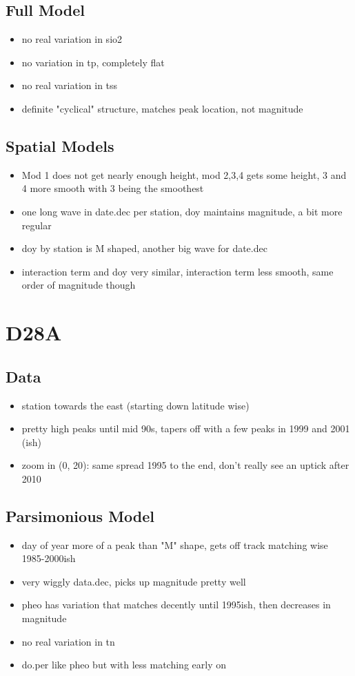 \documentclass[12pt]{amsart}
\begin{document}
\subsection{Full Model}
\begin{itemize}
\item no real variation in sio2
\item no variation in tp, completely flat
\item no real variation in tss
\item definite "cyclical" structure, matches peak location, not magnitude
\end{itemize}

\subsection{Spatial Models}
\begin{itemize}
\item Mod 1 does not get nearly enough height, mod 2,3,4 gets some height, 3 and 4 more smooth with 3 being the smoothest
\item one long wave in date.dec per station, doy maintains magnitude, a bit more regular
\item doy by station is M shaped, another big wave for date.dec
\item interaction term and doy very similar, interaction term less smooth, same order of magnitude though
\end{itemize}

\section{D28A}
\subsection{Data}
\begin{itemize}
\item station towards the east (starting down latitude wise)
\item pretty high peaks until mid 90s, tapers off with a few peaks in 1999 and 2001 (ish)
\item zoom in (0, 20): same spread 1995 to the end, don't really see an uptick after 2010
\end{itemize}
\subsection{Parsimonious Model}
\begin{itemize}
\item day of year more of a peak than "M" shape, gets off track matching wise 1985-2000ish
\item very wiggly data.dec, picks up magnitude pretty well
\item pheo has variation that matches decently until 1995ish, then decreases in magnitude
\item no real variation in tn
\item do.per like pheo but with less matching early on
\end{itemize}
\end{document}
